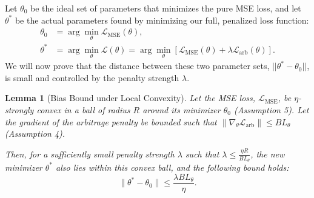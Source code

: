 \documentclass{article}
\newtheorem{lemma}[theorem]{Lemma}
\begin{document}
Let $\theta_0$ be the ideal set of parameters that minimizes the pure MSE loss, and let $\theta^*$ be the actual parameters found by minimizing our full, penalized loss function:
\begin{align*}
    \theta_0 &= \arg\min_{\theta} \mathcal{L}_{\text{MSE}}(\theta), \\
    \theta^* &= \arg\min_{\theta} \mathcal{L}(\theta) = \arg\min_{\theta} \left[ \mathcal{L}_{\text{MSE}}(\theta) + \lambda \mathcal{L}_{\text{arb}}(\theta) \right].
\end{align*}
We will now prove that the distance between these two parameter sets, $||\theta^* - \theta_0||$, is small and controlled by the penalty strength $\lambda$.

\begin{lemma}[Bias Bound under Local Convexity]
Let the MSE loss, $\mathcal{L}_{\text{MSE}}$, be $\eta$-strongly convex in a ball of radius $R$ around its minimizer $\theta_0$ (Assumption 5). Let the gradient of the arbitrage penalty be bounded such that $\|\nabla_\theta \mathcal{L}_{\text{arb}}\| \le B L_\theta$ (Assumption 4).

Then, for a sufficiently small penalty strength $\lambda$ such that $\lambda \le \frac{\eta R}{B L_\theta}$, the new minimizer $\theta^*$ also lies within this convex ball, and the following bound holds:
\[
\|\theta^* - \theta_0\| \le \frac{\lambda B L_\theta}{\eta}.
\]
\end{lemma}
\end{document}
